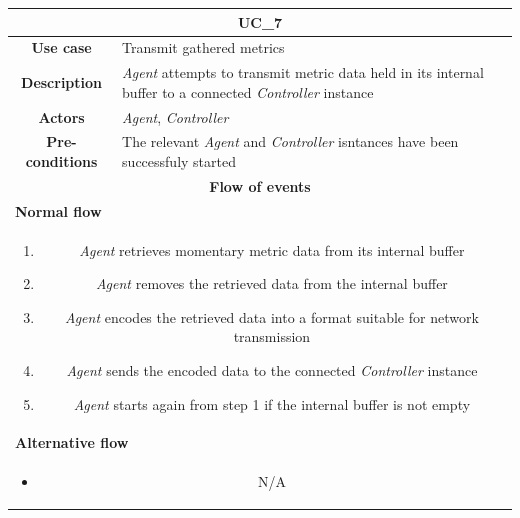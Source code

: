 \documentclass[12pt,a4paper,table]{article}
\begin{document}
            \vspace{0.5cm}
            \noindent
            \begin{longtable}{ |c|p{11.8cm}| }
                \hline
                \multicolumn{2}{|c|}{\cellcolor{lime} \textbf{UC\_7}}\\ \hline
                \cellcolor[gray]{0.9} \textbf{Use case} & Transmit gathered metrics\\ \hline
                \cellcolor[gray]{0.9} \textbf{Description} & \textit{Agent} attempts to transmit metric data held in its internal buffer to a connected \textit{Controller} instance\\ \hline
                \cellcolor[gray]{0.9} \textbf{Actors} & \textit{Agent}, \textit{Controller}\\ \hline
                \cellcolor[gray]{0.9} \textbf{Pre-conditions} & The relevant \textit{Agent} and \textit{Controller} isntances have been successfuly started\\ \hline
                \multicolumn{2}{|c|}{\cellcolor[gray]{0.9} \textbf{Flow of events}}\\ \hline
                \multicolumn{2}{|l|}{\cellcolor[gray]{0.9} \textbf{Normal flow}}\\ \hline
                \multicolumn{2}{|p{14cm}|}{
                    \begin{enumerate}
                        \item \textit{Agent} retrieves momentary metric data from its internal buffer
                        \item \textit{Agent} removes the retrieved data from the internal buffer
                        \item \textit{Agent} encodes the retrieved data into a format suitable for network transmission
                        \item \textit{Agent} sends the encoded data to the connected \textit{Controller} instance
                        \item \textit{Agent} starts again from step 1 if the internal buffer is not empty
                    \end{enumerate}
                }\\ \hline
                \multicolumn{2}{|l|}{\cellcolor[gray]{0.9} \textbf{Alternative flow}}\\ \hline
                \multicolumn{2}{|p{14cm}|}{
                    \begin{itemize}
                        \item N/A

\end{itemize}}
\end{longtable}
\end{document}
